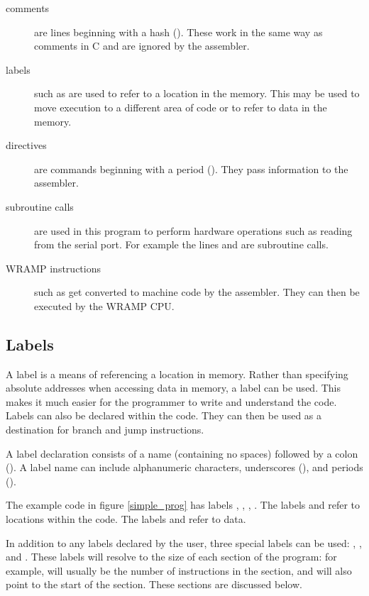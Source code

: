 \begin{description}
\item[comments] are lines beginning with a hash (\src{\#}). These work in
the same way as \src{//} comments in C and are ignored by the assembler.
%
\item[labels] such as  are used to refer to a location in the
memory. This may be used to move execution to a different area of code or
to refer to data in the memory.
%
\item[directives] are commands beginning with a period (). They
pass information to the assembler.
%
\item[subroutine calls] are used in this program to perform hardware
operations such as reading from the serial port. For example the
lines  and  are subroutine calls.
%
\item[WRAMP instructions] such as  get
converted to machine code by the assembler. They can then be executed by the
WRAMP CPU.
%
\end{description}

\subsection{Labels}
A label is a means of referencing a location in memory. Rather than
specifying absolute addresses when accessing data in memory, a label
can be used. This makes it much easier for the programmer to write
and understand the code. Labels can also be declared within the
code. They can then be used as a destination for branch and jump
instructions.

A label declaration consists of a name (containing no spaces) followed
by a colon (\src{:}). A label name can include alphanumeric characters,
underscores (\src{\_}), and periods ().

The example code in figure \ref{simple_prog} has labels ,
, , . The labels
 and  refer to locations within the code. The
labels  and  refer to data.

In addition to any labels declared by the user, three special labels
can be used: , , and .
These labels will resolve to the size of each section of the program:
for example,  will usually be the number of instructions
in the  section, and will also point to the start of the
 section. These sections are discussed below.

